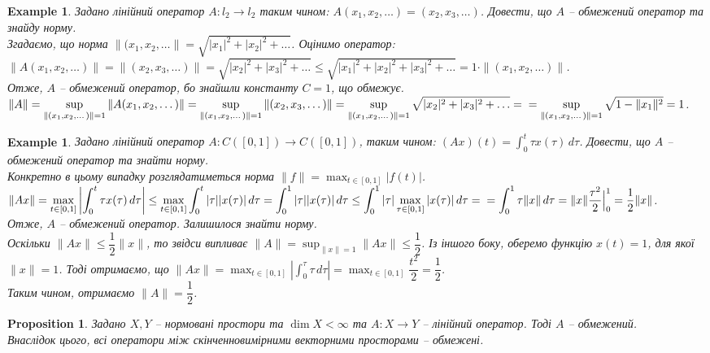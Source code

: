 \documentclass[a4paper, 10pt]{article}
\theoremstyle{theoremdd}
\theoremstyle{theoremdd}
\theoremstyle{theoremdd}
\theoremstyle{theoremdd}
\newtheorem{example}[theorem]{Example}
\theoremstyle{theoremdd}
\newtheorem{proposition}[theorem]{Proposition}
\theoremstyle{theoremdd}
\theoremstyle{theoremdd}
\theoremstyle{theoremdd}
\begin{document}
\begin{example}
Задано лінійний оператор $A \colon l_2 \to l_2$ таким чином: $A(x_1,x_2,\dots) = (x_2,x_3,\dots)$. Довести, що $A$ -- обмежений оператор та знайду норму.\\
Згадаємо, що норма $\|(x_1,x_2,\dots\| = \sqrt{|x_1|^2 + |x_2|^2 + \dots}$. Оцінимо оператор:\\
$\|A (x_1,x_2,\dots)\| = \|(x_2,x_3,\dots)\| = \sqrt{|x_2|^2 + |x_3|^2 + \dots} \leq \sqrt{|x_1|^2 + |x_2|^2 + |x_3|^2 + \dots} = 1 \cdot \|(x_1,x_2,\dots)\|$.\\
Отже, $A$ -- обмежений оператор, бо знайшли константу $C = 1$, що обмежує.\\
$\|A\| = \displaystyle\sup_{\|(x_1,x_2,\dots)\| = 1} \|A(x_1,x_2,\dots)\| = \displaystyle\sup_{\|(x_1,x_2,\dots)\| = 1} \|(x_2,x_3,\dots)\| = \sup_{\|(x_1,x_2,\dots)\| = 1} \sqrt{|x_2|^2 + |x_3|^2 + \dots} = \\
= \sup_{\|(x_1,x_2,\dots)\| = 1} \sqrt{1 - \|x_1\|^2} = 1$.
\end{example}

\begin{example}
Задано лінійний оператор $A \colon C([0,1]) \to C([0,1])$, таким чином: $(Ax)(t) = \displaystyle\int_0^t \tau x(\tau)\,d\tau$. Довести, що $A$ -- обмежений оператор та знайти норму.\\
Конкретно в цьому випадку розглядатиметься норма $\|f\| = \displaystyle\max_{t \in [0,1]} |f(t)|$.\\
$\displaystyle\|Ax\| = \max_{t \in [0,1]} \left| \int_0^t \tau x(\tau)\,d\tau \right| \leq \max_{t \in [0,1]} \int_0^t |\tau| |x(\tau)|\,d\tau = \int_0^1 |\tau| |x(\tau)|\,d\tau \leq \int_0^1 |\tau| \max_{\tau \in [0,1]} |x(\tau)|\,d\tau = \\
= \int_0^1 \tau \|x \|\,d\tau = \|x\| \dfrac{\tau^2}{2} \Big|_0^1 = \dfrac{1}{2} \|x\|$.\\
Отже, $A$ -- обмежений оператор. Залишилося знайти норму.\\
Оскільки $\|Ax\| \leq \dfrac{1}{2} \|x\|$, то звідси випливає $\|A\| = \displaystyle\sup_{\|x\| = 1} \|Ax\| \leq \dfrac{1}{2}$. Із іншого боку, оберемо функцію $x(t) = 1$, для якої $\|x\| = 1$. Тоді отримаємо, що $\|Ax\| = \displaystyle\max_{t \in [0,1]} \left|\int_0^\tau \tau\,d\tau\right| = \max_{t \in [0,1]} \dfrac{t^2}{2} = \dfrac{1}{2}$.\\
Таким чином, отримаємо $\|A\| = \dfrac{1}{2}$.
\end{example}

\begin{proposition}
Задано $X,Y$ -- нормовані простори та $\dim X < \infty$ та $A \colon X \to Y$ -- лінійний оператор. Тоді $A$ -- обмежений.\\
Внаслідок цього, всі оператори між скінченновимірними векторними просторами -- обмежені.
\end{proposition}
\end{document}

